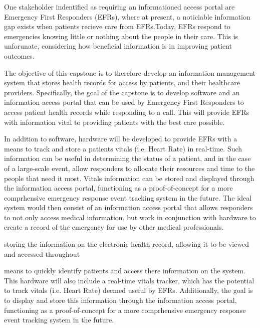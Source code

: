 One stakeholder indentified as requiring an informationed access portal are Emergency First Responders (EFRs), where at present, a noticiable information gap exists when patients recieve care from EFRs.\iffalse One situation where this information gap is the most noticiable is when patients recieve care from Emergency First Responders (EFRs).\fi Today, EFRs respond to emergencies knowing little or nothing about the people in their care. This is unforunate, considering how beneficial information is in improving patient outcomes. \iffalse For example, nursing homes often carry documents that contain health information on their residents. This information, including medications, allergies and diagonsed disorders gives EFRs an important base-knowledge for how assessing a patient. \fi

The objective of this capstone is to therefore develop an information management system that stores health records for access by patients, and their healthcare providers. Specifically, the goal of the capstone is to develop software and an information access portal that can be used by Emergency First Responders to access patient health records while responding to a call. This will provide EFRs with information vital to providing patients with the best care possible.

In addition to software, hardware will be developed to provide EFRs with a means to track and store a patients vitals (i.e. Heart Rate) in real-time. Such information can be useful in determining the status of a patient, and in the case of a large-scale event, allow responders to allocate their resources and time to the people that need it most. Vitals information can be stored and displayed through the information access portal, functioning as a proof-of-concept for a more comprhensive emergency response event tracking system in the future. The ideal system would then consist of an information access portal that allows responders to not only access medical information, but work in conjunction with hardware to create a record of the emergency for use by other medical professionals.

\iffalse
A system that allows responders to access medical information, but also to record the events of a response for later use by medical proffesionals.
\fi




\iffalse
storing the information on the electronic health record, allowing it to be viewed and accessed throughout


 means to quickly identify patients and access there information on the system. This hardware will also include a real-time vitals tracker, which has the potential to track vitals (i.e. Heart Rate) deemed useful by EFRs.
Additionally, the goal is to display and store this information through the information access portal, functioning as a proof-of-concept for a more comprhensive emergency response event tracking system in the future.



